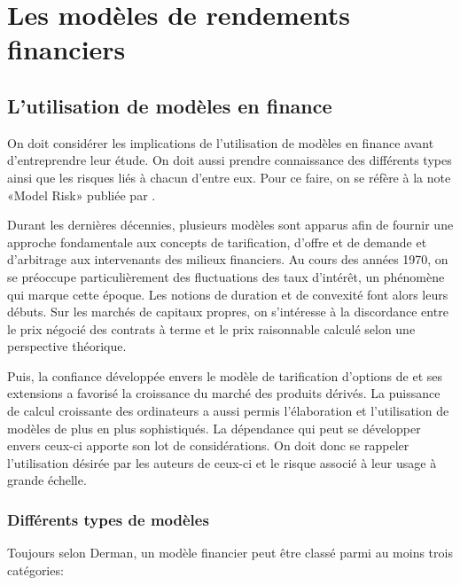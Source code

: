 \chapter{Les modèles de rendements financiers}

\section{L'utilisation de modèles en finance}
\label{sec:utilisationmodeles}

On doit considérer les implications de l'utilisation de modèles en
finance avant d'entreprendre leur étude. On doit aussi prendre
connaissance des différents types ainsi que les risques liés à chacun
d'entre eux. Pour ce faire, on se réfère à la note «Model Risk»
publiée par \cite{derman1996modelrisk}.

Durant les dernières décennies, plusieurs modèles sont apparus afin de
fournir une approche fondamentale aux concepts de tarification,
d'offre et de demande et d'arbitrage aux intervenants des milieux
financiers. Au cours des années 1970, on se préoccupe particulièrement
des fluctuations des taux d'intérêt, un phénomène qui marque cette
époque. Les notions de duration et de convexité font alors leurs
débuts. Sur les marchés de capitaux propres, on s'intéresse à la
discordance entre le prix négocié des contrats à terme et le prix
raisonnable calculé selon une perspective théorique.

Puis, la confiance développée envers le modèle de tarification
d'options de \cite{black1973pricing} et ses extensions a favorisé la
croissance du marché des produits dérivés. La puissance de calcul
croissante des ordinateurs a aussi permis l'élaboration et
l'utilisation de modèles de plus en plus sophistiqués. La dépendance
qui peut se développer envers ceux-ci apporte son lot de
considérations. On doit donc se rappeler l'utilisation désirée par les
auteurs de ceux-ci et le risque associé à leur usage à grande échelle.

\subsection{Différents types de modèles}
\label{sec:differentsmodeles}

Toujours selon Derman, un modèle financier peut être classé parmi au
moins trois catégories:

